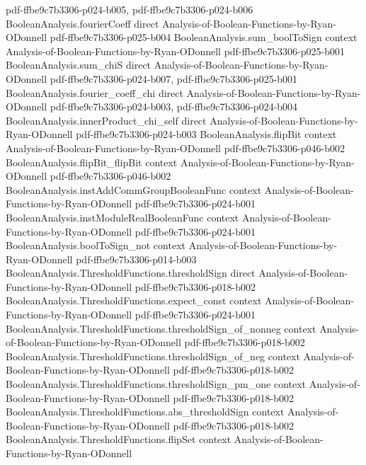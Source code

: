 \begin{lemma}
  {pdf-ffbe9c7b3306-p024-b005,
    pdf-ffbe9c7b3306-p024-b006}
\proofstep
  {BooleanAnalysis.fourierCoeff}
  {direct}
  {Analysis-of-Boolean-Functions-by-Ryan-ODonnell}
  {pdf-ffbe9c7b3306-p025-b004}
\proofstep
  {BooleanAnalysis.sum_boolToSign}
  {context}
  {Analysis-of-Boolean-Functions-by-Ryan-ODonnell}
  {pdf-ffbe9c7b3306-p025-b001}
\proofstep
  {BooleanAnalysis.sum_chiS}
  {direct}
  {Analysis-of-Boolean-Functions-by-Ryan-ODonnell}
  {pdf-ffbe9c7b3306-p024-b007,
    pdf-ffbe9c7b3306-p025-b001}
\proofstep
  {BooleanAnalysis.fourier_coeff_chi}
  {direct}
  {Analysis-of-Boolean-Functions-by-Ryan-ODonnell}
  {pdf-ffbe9c7b3306-p024-b003,
    pdf-ffbe9c7b3306-p024-b004}
\proofstep
  {BooleanAnalysis.innerProduct_chi_self}
  {direct}
  {Analysis-of-Boolean-Functions-by-Ryan-ODonnell}
  {pdf-ffbe9c7b3306-p024-b003}
\proofstep
  {BooleanAnalysis.flipBit}
  {context}
  {Analysis-of-Boolean-Functions-by-Ryan-ODonnell}
  {pdf-ffbe9c7b3306-p046-b002}
\proofstep
  {BooleanAnalysis.flipBit_flipBit}
  {context}
  {Analysis-of-Boolean-Functions-by-Ryan-ODonnell}
  {pdf-ffbe9c7b3306-p046-b002}
\proofstep
  {BooleanAnalysis.instAddCommGroupBooleanFunc}
  {context}
  {Analysis-of-Boolean-Functions-by-Ryan-ODonnell}
  {pdf-ffbe9c7b3306-p024-b001}
\proofstep
  {BooleanAnalysis.instModuleRealBooleanFunc}
  {context}
  {Analysis-of-Boolean-Functions-by-Ryan-ODonnell}
  {pdf-ffbe9c7b3306-p024-b001}
\proofstep
  {BooleanAnalysis.boolToSign_not}
  {context}
  {Analysis-of-Boolean-Functions-by-Ryan-ODonnell}
  {pdf-ffbe9c7b3306-p014-b003}
\proofstep
  {BooleanAnalysis.ThresholdFunctions.thresholdSign}
  {direct}
  {Analysis-of-Boolean-Functions-by-Ryan-ODonnell}
  {pdf-ffbe9c7b3306-p018-b002}
\proofstep
  {BooleanAnalysis.ThresholdFunctions.expect_const}
  {context}
  {Analysis-of-Boolean-Functions-by-Ryan-ODonnell}
  {pdf-ffbe9c7b3306-p024-b001}
\proofstep
  {BooleanAnalysis.ThresholdFunctions.thresholdSign_of_nonneg}
  {context}
  {Analysis-of-Boolean-Functions-by-Ryan-ODonnell}
  {pdf-ffbe9c7b3306-p018-b002}
\proofstep
  {BooleanAnalysis.ThresholdFunctions.thresholdSign_of_neg}
  {context}
  {Analysis-of-Boolean-Functions-by-Ryan-ODonnell}
  {pdf-ffbe9c7b3306-p018-b002}
\proofstep
  {BooleanAnalysis.ThresholdFunctions.thresholdSign_pm_one}
  {context}
  {Analysis-of-Boolean-Functions-by-Ryan-ODonnell}
  {pdf-ffbe9c7b3306-p018-b002}
\proofstep
  {BooleanAnalysis.ThresholdFunctions.abs_thresholdSign}
  {context}
  {Analysis-of-Boolean-Functions-by-Ryan-ODonnell}
  {pdf-ffbe9c7b3306-p018-b002}
\proofstep
  {BooleanAnalysis.ThresholdFunctions.flipSet}
  {context}
  {Analysis-of-Boolean-Functions-by-Ryan-ODonnell}

\end{lemma}
